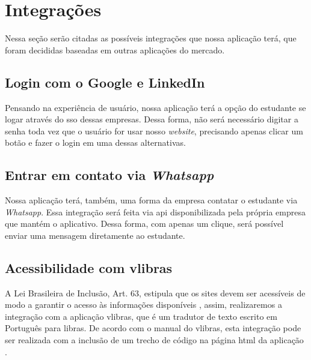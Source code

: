 \section{Integrações}
Nessa seção serão citadas as possíveis integrações que nossa aplicação terá, que foram decididas baseadas em outras aplicações do mercado.

\subsection{Login com o Google e LinkedIn}
Pensando na experiência de usuário, nossa aplicação terá a opção do estudante se logar através do \ac{sso} dessas empresas. Dessa forma, não será necessário digitar a senha toda vez que o usuário for usar nosso \emph{website}, precisando apenas clicar um botão e fazer o login em uma dessas alternativas.

\subsection{Entrar em contato via \emph{Whatsapp}}
Nossa aplicação terá, também, uma forma da empresa contatar o estudante via \emph{Whatsapp}. Essa integração será feita via \ac{api} disponibilizada pela própria empresa que mantém o aplicativo. Dessa forma, com apenas um clique, será possível enviar uma mensagem diretamente ao estudante.

\subsection{Acessibilidade com \gls{vlibras}}
A Lei Brasileira de Inclusão, Art. 63, estipula que os sites devem ser acessíveis de modo a garantir o acesso às informações disponíveis \cite{leiinclusao}, assim, realizaremos a integração com a aplicação \gls{vlibras}, que é um tradutor de texto escrito em Português para \ac{libras}. De acordo com o manual do \gls{vlibras}, esta integração pode ser realizada com a inclusão de um trecho de código na página \ac{html} da aplicação \cite{manualvlibras}.
